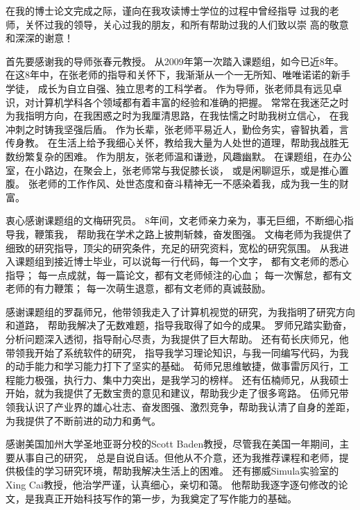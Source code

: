 

\begin{ack}
在我的博士论文完成之际，谨向在我攻读博士学位的过程中曾经指导
过我的老师，关怀过我的领导，关心过我的朋友，和所有帮助过我的人们致以崇
高的敬意和深深的谢意！

首先要感谢我的导师张春元教授。
从2009年第一次踏入课题组，如今已近8年。
在这8年中，在张老师的指导和关怀下，我渐渐从一个一无所知、唯唯诺诺的新手学徒，
成长为自立自强、独立思考的工科学者。
作为导师，张老师具有远见卓识，对计算机学科各个领域都有着丰富的经验和准确的把握。
常常在我迷茫之时为我指明方向，在我困惑之时为我厘清思路，在我怯懦之时助我树立信心，
在我冲刺之时铸我坚强后盾。
作为长辈，张老师平易近人，勤俭务实，睿智执着，言传身教。
在生活上给予我细心关怀，教给我大量为人处世的道理，帮助我战胜无数纷繁复杂的困难。
作为朋友，张老师温和谦逊，风趣幽默。
在课题组，在办公室，在小路边，在聚会上，张老师常与我促膝长谈，
或是闲聊逗乐，或是推心置腹。
张老师的工作作风、处世态度和奋斗精神无一不感染着我，成为我一生的财富。

衷心感谢课题组的文梅研究员。
8年间，文老师亲力亲为，事无巨细，不断细心指导我，鞭策我，
帮助我在学术之路上披荆斩棘，奋发图强。
文梅老师为我提供了细致的研究指导，顶尖的研究条件，充足的研究资料，宽松的研究氛围。
从我进入课题组到接近博士毕业，可以说每一行代码，每一个文字，
都有文老师的悉心指导；
每一点成就，每一篇论文，都有文老师倾注的心血；
每一次懈怠，都有文老师的有力鞭策；
每一次萌生退意，都有文老师的真诚鼓励。

感谢课题组的罗磊师兄，他带领我走入了计算机视觉的研究，为我指明了研究方向和道路，
帮助我解决了无数难题，指导我取得了如今的成果。
罗师兄踏实勤奋，分析问题深入透彻，指导耐心尽责，为我提供了巨大帮助。
还有荀长庆师兄，他带领我开始了系统软件的研究，
指导我学习理论知识，与我一同编写代码，为我的动手能力和学习能力打下了坚实的基础。
荀师兄思维敏捷，做事雷厉风行，工程能力极强，执行力、集中力突出，是我学习的榜样。
还有伍楠师兄，从我硕士开始，就为我提供了无数宝贵的意见和建议，帮助我少走了很多弯路。
伍师兄带领我认识了产业界的雄心壮志、奋发图强、激烈竞争，帮助我认清了自身的差距，为我提供了不断前进的动力和勇气。

感谢美国加州大学圣地亚哥分校的Scott Baden教授，尽管我在美国一年期间，主要从事自己的研究，
总是自说自话。但他从不介意，还为我推荐课程和老师，提供极佳的学习研究环境，帮助我解决生活上的困难。
还有挪威Simula实验室的Xing Cai教授，他治学严谨，认真细心，亲切和蔼。
他帮助我逐字逐句修改的论文，是我真正开始科技写作的第一步，为我奠定了写作能力的基础。


\end{ack}

